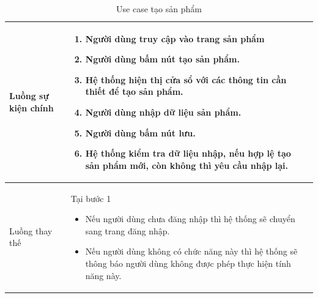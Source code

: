 \documentclass[12pt,a4paper]{article}
\begin{document}
\begin{table}[H]
\begin{tabular}{|p{3.5cm}|p{11.5cm}|c|}
            Luồng sự kiện chính & \vspace{-.8cm}\begin{enumerate}
                                                    \item Người dùng truy cập vào trang sản phẩm
                                                    \item  Người dùng bấm nút tạo sản phẩm.
                                                    \item  Hệ thống hiện thị cửa sổ với các thông tin cần thiết để tạo sản phẩm.
                                                    \item  Người dùng nhập dữ liệu sản phẩm.
                                                    \item Người dùng bấm nút lưu.
                                                    \item Hệ thống kiểm tra dữ liệu nhập, nếu hợp lệ tạo sản phẩm mới, còn không thì yêu cầu nhập lại.
            \end{enumerate}
            \\
            \hline
            Luồng thay thế & Tại bước 1\newline
            \vspace{-.8cm}\begin{itemize}
                              \item Nếu người dùng chưa đăng nhập thì hệ thống sẽ chuyển sang trang đăng nhập.
                              \item  Nếu người dùng không có chức năng này thì hệ thống sẽ thông báo người dùng không được phép thực hiện tính năng này.
            \end{itemize}
            \\
            \hline
        \end{tabular}
        \caption{Use case tạo sản phẩm}
    \end{table}


\end{document}
